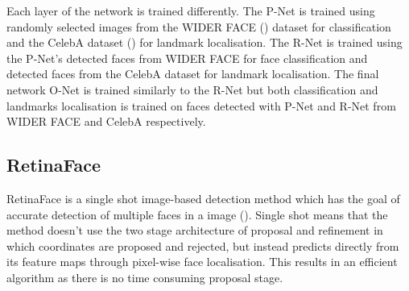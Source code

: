 \documentclass{l4proj}
\begin{document}
Each layer of the network is trained differently. The P-Net is trained using randomly selected images from the WIDER FACE (\cite{widerface}) dataset for classification and the CelebA dataset (\cite{celeba}) for landmark localisation. The R-Net is trained using the P-Net's detected faces from WIDER FACE for face classification and detected faces from the CelebA dataset for landmark localisation. The final network O-Net is trained similarly to the R-Net but both classification and landmarks localisation is trained on faces detected with P-Net and R-Net from WIDER FACE and CelebA respectively. 

\subsection{RetinaFace}
\label{retinaface}
RetinaFace is a single shot image-based detection method which has the goal of accurate detection of multiple faces in a image (\cite{retinaface}). Single shot means that the method doesn't use the two stage architecture of proposal and refinement in which coordinates are proposed and rejected, but instead predicts directly from its feature maps through pixel-wise face localisation. This results in an efficient algorithm as there is no time consuming proposal stage.
\end{document}
